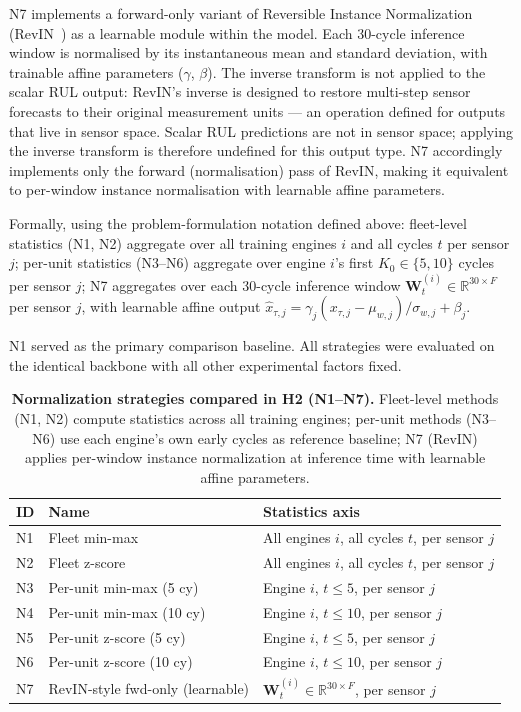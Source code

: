 \documentclass[review,12pt]{elsarticle}
\begin{document}
N7 implements a forward-only variant of Reversible Instance Normalization (RevIN~\cite{ref23}) as a learnable module within the model. Each 30-cycle inference window is normalised by its instantaneous mean and standard deviation, with trainable affine parameters ($\gamma$, $\beta$). The inverse transform is not applied to the scalar RUL output: RevIN's inverse is designed to restore multi-step sensor forecasts to their original measurement units --- an operation defined for outputs that live in sensor space. Scalar RUL predictions are not in sensor space; applying the inverse transform is therefore undefined for this output type. N7 accordingly implements only the forward (normalisation) pass of RevIN, making it equivalent to per-window instance normalisation with learnable affine parameters.

Formally, using the problem-formulation notation defined above: fleet-level statistics (N1, N2) aggregate over all training engines $i$ and all cycles $t$ per sensor $j$; per-unit statistics (N3--N6) aggregate over engine $i$'s first $K_0 \in \{5, 10\}$ cycles per sensor $j$; N7 aggregates over each 30-cycle inference window $\mathbf{W}_t^{(i)} \in \mathbb{R}^{30 \times F}$ per sensor $j$, with learnable affine output $\hat{x}_{\tau,j} = \gamma_j(x_{\tau,j} - \mu_{w,j})/\sigma_{w,j} + \beta_j$.

N1 served as the primary comparison baseline. All strategies were evaluated on the identical backbone with all other experimental factors fixed.

\begin{table}[!t]
\centering
\small
\caption*{\textbf{Normalization strategies compared in H2 (N1--N7).} Fleet-level methods (N1, N2) compute statistics across all training engines; per-unit methods (N3--N6) use each engine's own early cycles as reference baseline; N7 (RevIN) applies per-window instance normalization at inference time with learnable affine parameters.}
\label{tab:2}
\begin{tabular}{llp{5cm}}
\toprule
\textbf{ID} & \textbf{Name} & \textbf{Statistics axis} \\
\midrule
N1 & Fleet min-max & All engines $i$, all cycles $t$, per sensor $j$ \\
N2 & Fleet z-score & All engines $i$, all cycles $t$, per sensor $j$ \\
N3 & Per-unit min-max (5 cy) & Engine $i$, $t \le 5$, per sensor $j$ \\
N4 & Per-unit min-max (10 cy) & Engine $i$, $t \le 10$, per sensor $j$ \\
N5 & Per-unit z-score (5 cy) & Engine $i$, $t \le 5$, per sensor $j$ \\
N6 & Per-unit z-score (10 cy) & Engine $i$, $t \le 10$, per sensor $j$ \\
N7 & RevIN-style fwd-only (learnable) & $\mathbf{W}_t^{(i)} \in \mathbb{R}^{30 \times F}$, per sensor $j$ \\
\bottomrule
\end{tabular}
\end{table}
\end{document}
